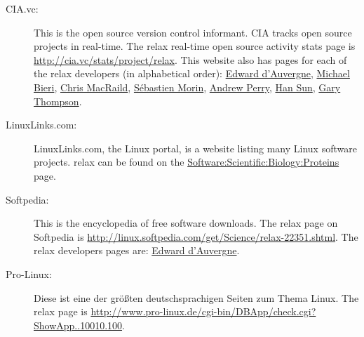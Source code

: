 \begin{description}
  \item[CIA.vc:]  This is the open source version control informant.
    CIA tracks open source projects in real-time.
    The relax real-time open source activity stats page is \href{http://cia.vc/stats/project/relax}{http://cia.vc/stats/project/relax}.
    This website also has pages for each of the relax developers (in alphabetical order):  \href{http://cia.vc/stats/author/bugman}{Edward d'Auvergne}, \href{http://cia.vc/stats/author/michaelbieri}{Michael Bieri}, \href{http://cia.vc/stats/author/macraild}{Chris MacRaild}, \href{http://cia.vc/stats/author/semor}{S\'ebastien Morin}, \href{http://cia.vc/stats/author/pansapiens}{Andrew Perry}, \href{http://cia.vc/stats/author/han87}{Han Sun}, \href{http://cia.vc/stats/author/varioustoxins}{Gary Thompson}.
  \item[LinuxLinks.com:]  LinuxLinks.com, the Linux portal, is a website listing many Linux software projects.
    relax can be found on the \href{http://linuxlinks.com/Software/Scientific/Biology/Proteins/}{Software:\-Scientific:\-Biology:\-Proteins} page.
  \item[Softpedia:]  This is the encyclopedia of free software downloads.
    The relax page on Softpedia is \href{http://linux.softpedia.com/get/Science/relax-22351.shtml}{http://linux.softpedia.com/get/Science/relax-22351.shtml}.
    The relax developers pages are:  \href{http://linux.softpedia.com/developer/Edward-d-039-Auvergne-5136.html}{Edward d'Auvergne}.
  \item[Pro-Linux:]  Diese ist eine der gr\"o{\ss}ten deutschsprachigen Seiten zum Thema Linux.
    The relax page is \href{http://www.pro-linux.de/cgi-bin/DBApp/check.cgi?ShowApp..10010.100}{http://\-www.\-pro\--linux.\-de/\-cgi\--bin/\-DB\-App/\-check\-.cgi\-?ShowApp..10010.100}.
\end{description}
